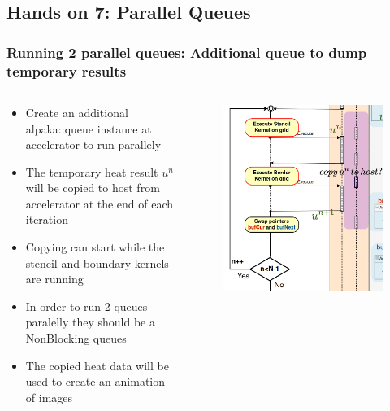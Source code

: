 \documentclass[9pt]{beamer}
\begin{document}
\subsection{Hands on 7: Parallel Queues}
\begin{frame}
\frametitle{Running 2 parallel queues: Additional queue to dump temporary results}
\begin{columns}
  \begin{column}{0.63\textwidth}
\begin{itemize}
 \item Create an additional alpaka::queue instance at accelerator to run parallely
 \item The temporary heat result $u^{n}$ will be copied to host from accelerator at the end of each iteration
 \item Copying can start while the stencil and boundary kernels are running
 \item In order to run 2 queues paralelly they should be a NonBlocking queues
 \item The copied heat data will be used to create an animation of images
\end{itemize}
  \end{column}

  \begin{column}{0.37\textwidth}
\begin{figure}
    \centering
    \includegraphics[width=0.99\linewidth]{Screenshot from 2024-09-26 15-53-41.png}
\end{figure}
  \end{column}
  \end{columns}
\end{frame}
\end{document}
